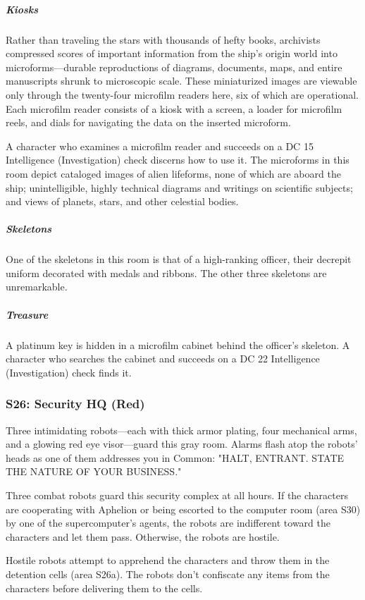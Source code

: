 \documentclass[10pt,a4paper,twoside,bg=print,twocolumn,openany,nodeprecatedcode]{dndbook}
\begin{document}
\subparagraph{Kiosks}
Rather than traveling the stars with thousands of hefty books, archivists compressed scores of important information from the ship's origin world into microforms—durable reproductions of diagrams, documents, maps, and entire manuscripts shrunk to microscopic scale. These miniaturized images are viewable only through the twenty-four microfilm readers here, six of which are operational. Each microfilm reader consists of a kiosk with a screen, a loader for microfilm reels, and dials for navigating the data on the inserted microform.

A character who examines a microfilm reader and succeeds on a DC 15 Intelligence (Investigation) check discerns how to use it. The microforms in this room depict cataloged images of alien lifeforms, none of which are aboard the ship; unintelligible, highly technical diagrams and writings on scientific subjects; and views of planets, stars, and other celestial bodies.

\subparagraph{Skeletons}
One of the skeletons in this room is that of a high-ranking officer, their decrepit uniform decorated with medals and ribbons. The other three skeletons are unremarkable.

\subparagraph{Treasure}
A platinum key is hidden in a microfilm cabinet behind the officer's skeleton. A character who searches the cabinet and succeeds on a DC 22 Intelligence (Investigation) check finds it.

\subsubsection{S26: Security HQ (Red)}
\begin{DndReadAloud}{}
Three intimidating robots—each with thick armor plating, four mechanical arms, and a glowing red eye visor—guard this gray room. Alarms flash atop the robots' heads as one of them addresses you in Common: "HALT, ENTRANT. STATE THE NATURE OF YOUR BUSINESS."

\end{DndReadAloud}

Three combat robots guard this security complex at all hours. If the characters are cooperating with Aphelion or being escorted to the computer room (area S30) by one of the supercomputer's agents, the robots are indifferent toward the characters and let them pass. Otherwise, the robots are hostile.

Hostile robots attempt to apprehend the characters and throw them in the detention cells (area S26a). The robots don't confiscate any items from the characters before delivering them to the cells.
\end{document}
